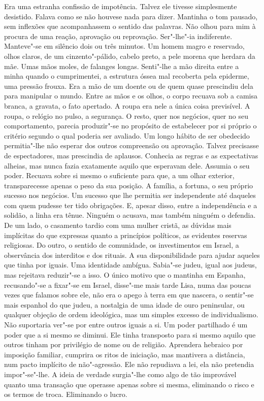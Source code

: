 Era uma estranha confissão de impotência. Talvez ele tivesse
simplesmente desistido. Falava como se não houvese nada para dizer.
Mantinha o tom pausado, sem inflexões que acompanhassem o sentido das
palavras. Não olhou para mim à procura de uma reação, aprovação ou
reprovação. Ser"-lhe"-ia indiferente. Manteve"-se em silêncio dois ou
três minutos. Um homem magro e reservado, olhos claros, de um
cinzento"-pálido, cabelo preto, a pele morena que herdara da mãe. Umas
mãos moles, de falanges longas. Senti"-lhe a mão direita entre a minha
quando o cumprimentei, a estrutura óssea mal recoberta pela epiderme,
uma pressão frouxa. Era a mão de um doente ou de quem quase prescindiu
dela para manipular o mundo. Entre as mãos e os olhos, o corpo recuava
sob a camisa branca, a gravata, o fato apertado. A roupa era nele a
única coisa previsível. A roupa, o relógio no pulso, a segurança. O
resto, quer nos negócios, quer no seu comportamento, parecia
produzir"-se no propósito de estabelecer por si próprio o critério
segundo o qual poderia ser avaliado. Um longo hábito de ser obedecido
permitia"-lhe não esperar dos outros compreensão ou aprovação. Talvez
precisasse de espectadores, mas prescindia de aplausos. Conhecia as
regras e as expectativas alheias, mas nunca fazia exatamente aquilo que
esperavam dele. Assumia o seu poder. Recuava sobre si mesmo o suficiente
para que, a um olhar exterior, transparecesse apenas o peso da sua
posição. A família, a fortuna, o seu próprio sucesso nos negócios. Um
sucesso que lhe permitia ser independente até daqueles com quem pudesse
ter tido obrigações. E, apesar disso, entre a independência e a solidão,
a linha era tênue. Ninguém o acusava, mas também ninguém o defendia. De
um lado, o casamento tardio com uma mulher cristã, as dúvidas mais
implícitas do que expressas quanto a princípios políticos, as evidentes
reservas religiosas. Do outro, o sentido de comunidade, os investimentos
em Israel, a observância dos interditos e dos rituais. A sua
disponibilidade para ajudar aqueles que tinha por iguais. Uma identidade
ambígua. Sabia"-se judeu, igual aos judeus, mas rejeitava reduzir"-se a
isso. O único motivo que o mantinha em Espanha, recusando"-se a
fixar"-se em Israel, disse"-me mais tarde Lisa, numa das poucas vezes
que falamos sobre ele, não era o apego à terra em que nascera, o
sentir"-se mais espanhol do que judeu, a nostalgia de uma idade de ouro
peninsular, ou qualquer objeção de ordem ideológica, mas um simples
excesso de individualismo. Não suportaria ver"-se por entre outros
iguais a si. Um poder partilhado é um poder que a si mesmo se diminui.
Ele tinha transposto para si mesmo aquilo que outros tinham por
privilégio de nome ou de religião. Aprendera hebraico por imposição
familiar, cumprira os ritos de iniciação, mas mantivera a distância, num
pacto implícito de não"-agressão. Ele não repudiava a lei, ela não
pretendia impor"-se"-lhe. A ideia de verdade surgia"-lhe como algo de
tão improvável quanto uma transação que operasse apenas sobre si mesma,
eliminando o risco e os termos de troca. Eliminando o lucro.

